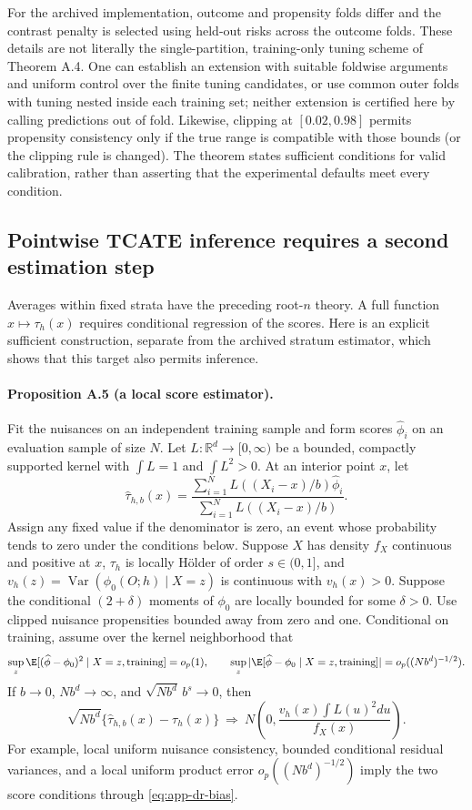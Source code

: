 For the archived implementation, outcome and propensity folds differ and the contrast penalty is selected using held-out risks across the outcome folds. These details are not literally the single-partition, training-only tuning scheme of Theorem A.4. One can establish an extension with suitable foldwise arguments and uniform control over the finite tuning candidates, or use common outer folds with tuning nested inside each training set; neither extension is certified here by calling predictions out of fold. Likewise, clipping at $[0.02,0.98]$ permits propensity consistency only if the true range is compatible with those bounds (or the clipping rule is changed). The theorem states sufficient conditions for valid calibration, rather than asserting that the experimental defaults meet every condition.

\subsection{Pointwise TCATE inference requires a second estimation step}

Averages within fixed strata have the preceding root-$n$ theory. A full function $x\mapsto\tau_h(x)$ requires conditional regression of the scores. Here is an explicit sufficient construction, separate from the archived stratum estimator, which shows that this target also permits inference.

\paragraph{Proposition A.5 (a local score estimator).}
Fit the nuisances on an independent training sample and form scores $\widehat\phi_i$ on an evaluation sample of size $N$. Let $L:\mathbb R^d\to[0,\infty)$ be a bounded, compactly supported kernel with $\int L=1$ and $\int L^2>0$. At an interior point $x$, let
\[
 \widehat\tau_{h,b}(x)=\frac{\sum_{i=1}^N L((X_i-x)/b)\widehat\phi_i}{\sum_{i=1}^N L((X_i-x)/b)}.
\]
Assign any fixed value if the denominator is zero, an event whose probability tends to zero under the conditions below. Suppose $X$ has density $f_X$ continuous and positive at $x$, $\tau_h$ is locally H\"older of order $s\in(0,1]$, and $v_h(z)=\operatorname{Var}(\phi_0(O;h)\mid X=z)$ is continuous with $v_h(x)>0$. Suppose the conditional $(2+\delta)$ moments of $\phi_0$ are locally bounded for some $\delta>0$. Use clipped nuisance propensities bounded away from zero and one. Conditional on training, assume over the kernel neighborhood that
\[
 \sup_z\E[(\widehat\phi-\phi_0)^2\mid X=z,\text{training}]=o_p(1),\qquad
 \sup_z|\E[\widehat\phi-\phi_0\mid X=z,\text{training}]|=o_p((Nb^d)^{-1/2}).
\]
If $b\to0$, $Nb^d\to\infty$, and $\sqrt{Nb^d}\,b^s\to0$, then
\begin{equation}
 \sqrt{Nb^d}\{\widehat\tau_{h,b}(x)-\tau_h(x)\}
 \ \Longrightarrow\ N\left(0,\frac{v_h(x)\int L(u)^2du}{f_X(x)}\right).
 \label{eq:app-local-clt}
\end{equation}
For example, local uniform nuisance consistency, bounded conditional residual variances, and a local uniform product error $o_p((Nb^d)^{-1/2})$ imply the two score conditions through \eqref{eq:app-dr-bias}.

